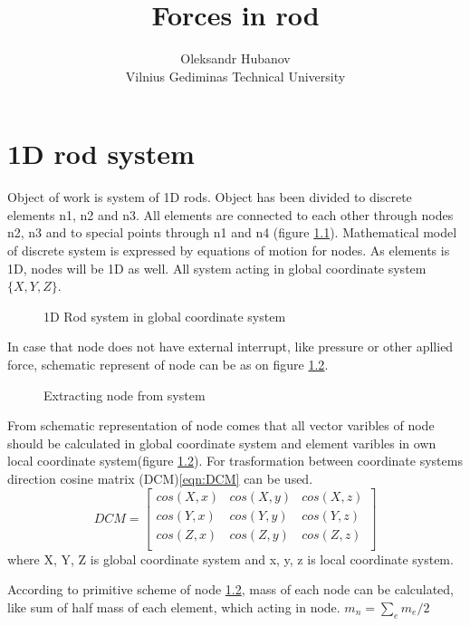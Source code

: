 \documentclass[12pt]{report}
\begin{document}
\title{Forces in rod}
\author{Oleksandr Hubanov\\
Vilnius Gediminas Technical University}
\maketitle
\pagebreak
\chapter {1D rod system}\par
Object of work is system of 1D rods. Object has been divided to discrete elements n1, n2 and n3.
All elements are connected to each other through nodes n2, n3 and to special points through n1 and n4
(figure \ref{fig:rodSystem}). Mathematical model of discrete system is expressed by equations of motion for nodes.
As elements is 1D, nodes will be 1D as well. All system acting in global coordinate system $\{X, Y, Z\}$.\par
\begin{figure}[ht]
  \centering
      
  \caption{1D Rod system in global coordinate system}\label{fig:rodSystem}      
\end{figure}
In case that node does not have external interrupt, like pressure or other apllied force, schematic represent of node
can be as on figure \ref{fig:nodeExtract}.\par
\begin{figure}[ht]
  \centering
      
  \caption{Extracting node from system}\label{fig:nodeExtract}
\end{figure}
From schematic representation of node comes that all vector varibles of node should be calculated in global coordinate 
system and element varibles in own local coordinate system(figure \ref{fig:nodeExtract}). For trasformation between 
coordinate systems direction cosine matrix (DCM)\eqref{eqn:DCM} can be used.
\begin{equation}\label{eqn:DCM}
  DCM= \begin{bmatrix}
    cos(X,x)&cos(X,y)&cos(X,z)\\
    cos(Y,x)&cos(Y,y)&cos(Y,z)\\
    cos(Z,x)&cos(Z,y)&cos(Z,z)\\
   \end{bmatrix} 
\end{equation}
where {X, Y, Z} is global coordinate system and {x, y, z} is local coordinate system.\par
According to primitive scheme of node \ref{fig:nodeExtract}, mass of each node can be calculated,
like sum of half mass of each element, which acting in node.
$m_n=\sum_{e}m_e/2$\par
\end{document}
